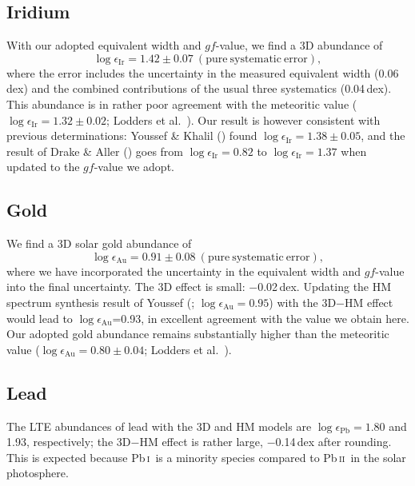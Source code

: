 \documentclass[traditabstract]{aa}
\newcommand{\altpbi}{Pb\,\textsc{i}}
\newcommand{\altpbii}{Pb\,\textsc{ii}}
\newcommand{\pbi}{\altpbi\ }
\newcommand{\pbii}{\altpbii\ }
\begin{document}
\subsection{Iridium}
With our adopted equivalent width and $gf$-value, we find a 3D abundance of 
\begin{displaymath}
\log\epsilon_{\mathrm{Ir}}=1.42\pm0.07\ \mathrm{(pure\ systematic\ error)},
\end{displaymath}
where the error includes the uncertainty in the measured equivalent width (0.06\,dex) and the combined contributions of the usual three systematics (0.04\,dex). This abundance is in rather poor agreement with the meteoritic value ($\log \epsilon_{\mathrm{Ir}}=1.32\pm0.02$; Lodders et al.\ \cite{lodd}).  Our result is however consistent with previous determinations: Youssef \& Khalil (\cite{yous2}) found $\log\epsilon_{\mathrm{Ir}}=1.38\pm0.05$, and the result of Drake \& Aller (\cite{drake}) goes from $\log\epsilon_{\mathrm{Ir}}=0.82$ to $\log\epsilon_{\mathrm{Ir}}=1.37$ when updated to the $gf$-value we adopt.

\subsection{Gold}
We find a 3D solar gold abundance of
\begin{displaymath}
\log\epsilon_{\mathrm{Au}}=0.91\pm0.08\ \mathrm{(pure\ systematic\ error)}, 
\end{displaymath}
where we have incorporated the uncertainty in the equivalent width and $gf$-value into the final uncertainty.  The 3D effect is small: $-$0.02\,dex.  Updating the HM spectrum synthesis result of Youssef (\cite{yous3}; $\log\epsilon_{\mathrm{Au}}=0.95$) with the 3D$-$HM effect would lead to $\log\epsilon_{\mathrm{Au}}$=0.93, in excellent agreement with the value we obtain here.  Our adopted gold abundance remains substantially higher than the meteoritic value ($\log \epsilon_{\mathrm{Au}}=0.80\pm0.04$; Lodders et al.\ \cite{lodd}).

\subsection{Lead}
\label{pbresults}
The LTE abundances of lead with the 3D and HM models are $\log\epsilon_{\mathrm{Pb}}=1.80$ and 1.93, respectively; the 3D$-$HM effect is rather large, $-$0.14\,dex after rounding. This is expected because \pbi is a minority species compared to \pbii in the solar photosphere. 
\end{document}

